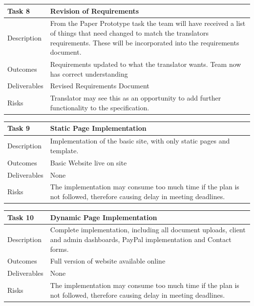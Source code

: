 \documentclass{l3proj}
\begin{document}
\begin{center}
    \begin{tabular}{ | l | p{12cm} |}
    \hline	
    Task 8 & Revision of Requirements \\ \hline
    Description & From the Paper Prototype task the team will have received a list of things that need changed to match the translators requirements. These will be incorporated into the requirements document. \\ \hline   
    Outcomes & Requirements updated to what the translator wants. Team now has correct understanding \\ \hline
    Deliverables & Revised Requirements Document \\ \hline
    Risks & Translator may see this as an opportunity to add further functionality to the specification. \\ 
    \hline
    \end{tabular}
\end{center}

\begin{center}
    \begin{tabular}{ | l | p{12cm} |}
    \hline	
    Task 9 & Static Page Implementation \\ \hline
    Description & Implementation of the basic site, with only static pages and template. \\ \hline   
    Outcomes & Basic Website live on site \\ \hline
    Deliverables & None \\ \hline
    Risks & The implementation may consume too much time if the plan is not followed, therefore causing delay in meeting deadlines. \\ 
    \hline
    \end{tabular}
\end{center}

\begin{center}
    \begin{tabular}{ | l | p{12cm} |}
    \hline	
    Task 10 & Dynamic Page Implementation \\ \hline
    Description & Complete implementation, including all document uploads, client and admin dashboards, PayPal implementation and Contact forms. \\ \hline   
    Outcomes & Full version of website available online \\ \hline
    Deliverables & None \\ \hline
    Risks & The implementation may consume too much time if the plan is not followed, therefore causing delay in meeting deadlines. \\ 
    \hline
    \end{tabular}
\end{center}
\end{document}
